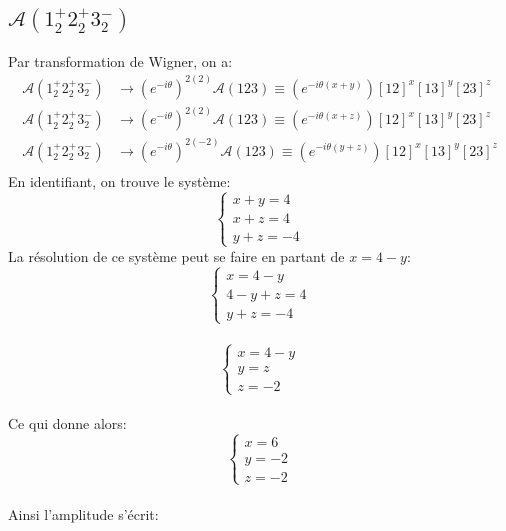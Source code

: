 \documentclass[12pt, a4paper]{article}
\begin{document}
	\subsection{$\mathcal{A}(1^{+}_2 2^{+}_2 3^{-}_2)$}
	Par transformation de Wigner, on a:
	\begin{equation}
		\begin{split}
			\mathcal{A}(1^{+}_2 2^{+}_2 3^{-}_2) &\rightarrow (e^{-i \theta})^{2(2)}\mathcal{A}(123)\equiv (e^{-i \theta(x+y)})[12]^x [13]^y [23]^z \\
			\mathcal{A}(1^{+}_2 2^{+}_2 3^{-}_2) &\rightarrow (e^{-i \theta})^{2(2)}\mathcal{A}(123)\equiv (e^{-i \theta(x+z)})[12]^x [13]^y [23]^z \\
			\mathcal{A}(1^{+}_2 2^{+}_2 3^{-}_2) &\rightarrow (e^{-i \theta})^{2(-2)}\mathcal{A}(123)\equiv (e^{-i \theta(y+z)})[12]^x [13]^y [23]^z \\
		\end{split}
	\end{equation}
	En identifiant, on trouve le système:
	\[
	\begin{cases}
		x+y=4\\
		x+z=4\\
		y+z=-4
	\end{cases}
	\]
	La résolution de ce système peut se faire en partant de $x=4-y$:\\
	\[
	\begin{cases}
		x=4-y\\
		4-y+z=4\\
		y+z=-4
	\end{cases}
	\]\\
	\[
	\begin{cases}
		x=4-y\\
		y=z\\
		z=-2
	\end{cases}
	\]\\
	Ce qui donne alors:
	\[
	\begin{cases}
		x=6\\
		y=-2\\
		z=-2
	\end{cases}
	\]\\
	Ainsi l'amplitude s'écrit:
	\begin{center}
		\Large
	\end{center} 
	
\end{document}
